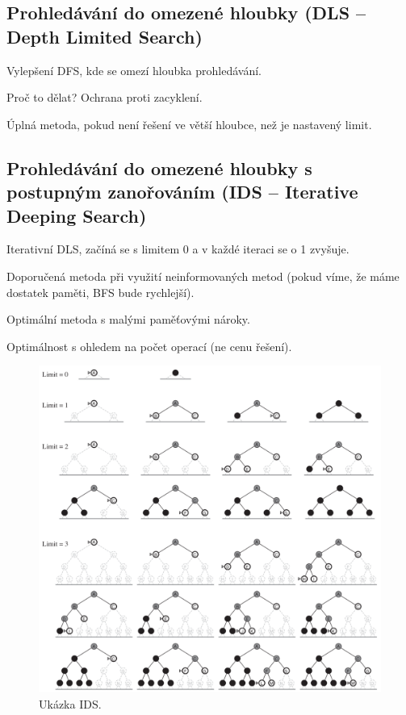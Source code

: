 \subsection{Prohledávání do omezené hloubky (DLS -- Depth Limited Search)}

\begin{compactitem}
    \item Vylepšení DFS, kde se omezí hloubka prohledávání. \begin{compactitem}
        \item Proč to dělat? Ochrana proti zacyklení.
    \end{compactitem}
    \item Úplná metoda, pokud není řešení ve větší
    hloubce, než je nastavený limit.
\end{compactitem}

\subsection{Prohledávání do omezené hloubky s postupným zanořováním (IDS -- Iterative Deeping Search)}

\begin{compactitem}
    \item Iterativní DLS, začíná se s limitem 0 a v každé iteraci se o 1 zvyšuje.
    \item Doporučená metoda při využití neinformovaných metod (pokud víme, že máme dostatek paměti, BFS bude rychlejší).
    \item Optimální metoda s malými paměťovými nároky.
    \item Optimálnost s ohledem na počet operací (ne cenu řešení).

    \begin{figure}[H]
        \centering
        \includegraphics[width=1\linewidth]{ids.png}
        \caption{Ukázka IDS.}
    \end{figure}
\end{compactitem}

